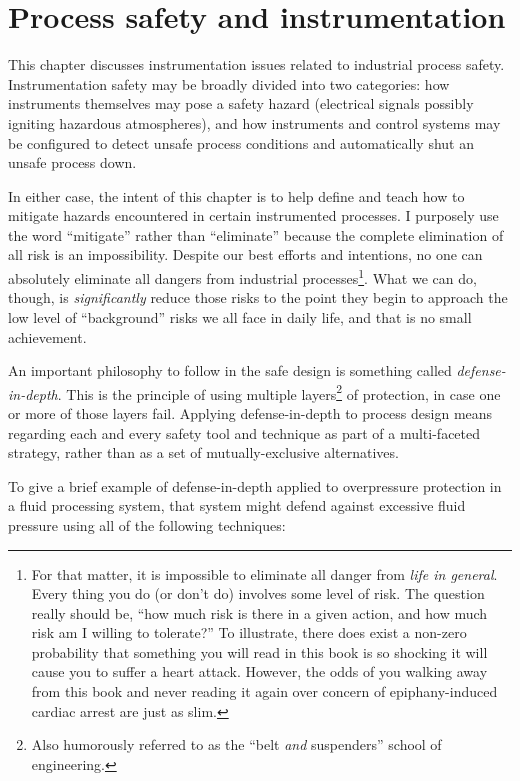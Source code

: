 
\chapter{Process safety and instrumentation}

This chapter discusses instrumentation issues related to industrial process safety.  Instrumentation safety may be broadly divided into two categories: how instruments themselves may pose a safety hazard (electrical signals possibly igniting hazardous atmospheres), and how instruments and control systems may be configured to detect unsafe process conditions and automatically shut an unsafe process down.

In either case, the intent of this chapter is to help define and teach how to mitigate hazards encountered in certain instrumented processes.  I purposely use the word ``mitigate'' rather than ``eliminate'' because the complete elimination of all risk is an impossibility.  Despite our best efforts and intentions, no one can absolutely eliminate all dangers from industrial processes\footnote{For that matter, it is impossible to eliminate all danger from \textit{life in general}.  Every thing you do (or don't do) involves some level of risk.  The question really should be, ``how much risk is there in a given action, and how much risk am I willing to tolerate?''  To illustrate, there does exist a non-zero probability that something you will read in this book is so shocking it will cause you to suffer a heart attack.  However, the odds of you walking away from this book and never reading it again over concern of epiphany-induced cardiac arrest are just as slim.}.  What we can do, though, is \textit{significantly} reduce those risks to the point they begin to approach the low level of ``background'' risks we all face in daily life, and that is no small achievement.

\vskip 10pt

An important philosophy to follow in the safe design is something called \textit{defense-in-depth}.  This is the principle of using multiple layers\footnote{Also humorously referred to as the ``belt \textit{and} suspenders'' school of engineering.} of protection, in case one or more of those layers fail.  Applying defense-in-depth to process design means regarding each and every safety tool and technique as part of a multi-faceted strategy, rather than as a set of mutually-exclusive alternatives.  

To give a brief example of defense-in-depth applied to overpressure protection in a fluid processing system, that system might defend against excessive fluid pressure using all of the following techniques:

